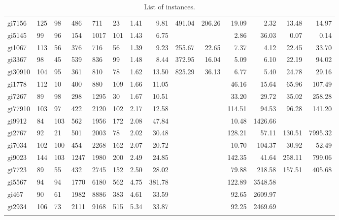 \documentclass[runningheads]{llncs}
\begin{document}
{\begin{longtable}{l lllll rrrr rrrr }
gi7156 & 125 & 98 & 486 & 711 & 23 & 1.41 & 9.81 & 491.04 & 206.26 & 19.09 & 2.32 & 13.48 & 14.97 \\
gi5145 & 99 & 96 & 154 & 1017 & 101 & 1.43 & 6.75 &  &  & 2.86 & 36.03 & 0.07 & 0.14 \\
gi1067 & 113 & 56 & 376 & 716 & 56 & 1.39 & 9.23 & 255.67 & 22.65 & 7.37 & 4.12 & 22.45 & 33.70 \\
gi3367 & 98 & 45 & 539 & 836 & 99 & 1.48 & 8.44 & 372.95 & 16.04 & 5.09 & 6.10 & 22.19 & 94.02 \\
gi30910 & 104 & 95 & 361 & 810 & 78 & 1.62 & 13.50 & 825.29 & 36.13 & 6.77 & 5.40 & 24.78 & 29.16 \\
gi1778 & 112 & 10 & 400 & 880 & 109 & 1.66 & 11.05 &  &  & 46.16 & 15.64 & 65.96 & 107.49 \\
gi7267 & 89 & 98 & 298 & 1295 & 30 & 1.67 & 10.51 &  &  & 33.20 & 29.72 & 35.02 & 258.28 \\
gi77910 & 103 & 97 & 422 & 2120 & 102 & 2.17 & 12.58 &  &  & 114.51 & 94.53 & 96.28 & 141.20 \\
gi9912 & 84 & 103 & 562 & 1956 & 172 & 2.08 & 47.84 &  &  & 10.48 & 1426.66 &  &  \\
gi2767 & 92 & 21 & 501 & 2003 & 78 & 2.02 & 30.48 &  &  & 128.21 & 57.11 & 130.51 & 7995.32 \\
gi7034 & 102 & 100 & 454 & 2268 & 162 & 2.07 & 20.72 &  &  & 10.70 & 104.37 & 30.92 & 52.49 \\
gi9023 & 144 & 103 & 1247 & 1980 & 200 & 2.49 & 24.85 &  &  & 142.35 & 41.64 & 258.11 & 799.06 \\
gi7723 & 89 & 55 & 432 & 2745 & 152 & 2.50 & 28.02 &  &  & 79.88 & 218.58 & 157.51 & 405.68 \\
gi5567 & 94 & 94 & 1770 & 6180 & 562 & 4.75 & 381.78 &  &  & 122.89 & 3548.58 &  &  \\
gi467 & 90 & 61 & 1982 & 8886 & 383 & 4.61 & 33.59 &  &  & 92.65 & 2609.97 &  &  \\
gi2934 & 106 & 73 & 2111 & 9168 & 515 & 5.34 & 33.87 &  &  & 92.25 & 2469.69 &  &  \\
\caption{List of instances.}
\label{appendix:tab:instances}
\end{longtable}
}  
\end{document}
